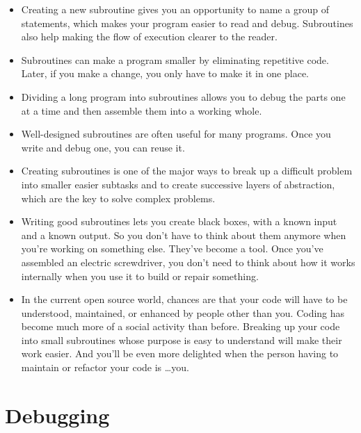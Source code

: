 \begin{itemize}

\item Creating a new subroutine gives you an opportunity to 
name a group of statements, which makes your program easier 
to read and debug. Subroutines also help making the flow of 
execution clearer to the reader.

\item Subroutines can make a program smaller by eliminating 
repetitive code.  Later, if you make a change, you only have
to make it in one place.

\item Dividing a long program into subroutines allows you 
to debug the parts one at a time and then assemble them 
into a working whole.

\item Well-designed subroutines are often useful for many programs.
Once you write and debug one, you can reuse it.

\item Creating subroutines is one of the major ways to 
break up a difficult problem into smaller easier subtasks 
and to create successive layers of abstraction, which are 
the key to solve complex problems.

\item Writing good subroutines lets you create black boxes, with 
a known input and a known output. So you don't have to think 
about them anymore when you're working on something else.  
They've become a tool.  Once you've assembled an electric 
screwdriver, you don't need to think about how it works internally 
when you use it to build or repair something.

\item In the current open source world, chances are that your 
code will have to be understood, maintained, or enhanced by 
people other than you. Coding has become much more of a social 
activity than before. Breaking up your code into small subroutines 
whose purpose is easy to understand will make their work easier. 
And you'll be even more delighted when the person 
having to maintain or refactor your code is \ldots you.

\end{itemize}


\section{Debugging}


